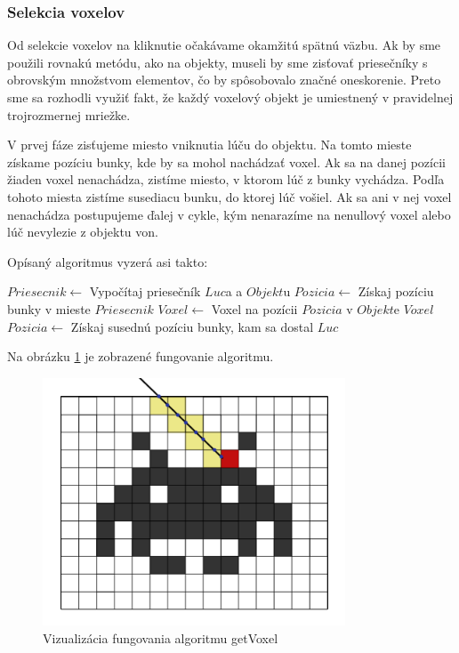 \subsubsection{Selekcia voxelov}
Od selekcie voxelov na kliknutie očakávame okamžitú spätnú väzbu. Ak by sme použili rovnakú metódu, ako na objekty, museli by sme zisťovať priesečníky s obrovským množstvom elementov, čo by spôsobovalo značné oneskorenie. Preto sme sa rozhodli využiť fakt, že každý voxelový objekt je umiestnený v pravidelnej trojrozmernej mriežke.

V prvej fáze zisťujeme miesto vniknutia lúču do objektu.
Na tomto mieste získame pozíciu bunky, kde by sa mohol nachádzať voxel.
Ak sa na danej pozícii žiaden voxel nenachádza, zistíme miesto, v ktorom lúč z bunky vychádza.
Podľa tohoto miesta zistíme susediacu bunku, do ktorej lúč vošiel.
Ak sa ani v nej voxel nenachádza postupujeme ďalej v cykle, kým nenarazíme na nenullový voxel alebo lúč nevylezie z objektu von. \\

\begin{minipage}{0.9\textwidth}
Opísaný algoritmus vyzerá asi takto:

\begin{algorithmic}
		\State $Priesecnik \gets $ Vypočítaj priesečník $Luc$a a $Objekt$u
		\State $Pozicia \gets $ Získaj pozíciu bunky v mieste $Priesecnik$
			\State $Voxel \gets $ Voxel na pozícii $Pozicia$ v $Objekt$e 
				\State \Return $Voxel$
			\EndIf 
			\State $Pozicia \gets$ Získaj susednú pozíciu bunky, kam sa dostal $Luc$ 
		\EndWhile
	\EndFunction \\
\end{algorithmic} 
\end{minipage}
\eject

Na obrázku \ref{invader} je zobrazené fungovanie algoritmu. 

\begin{figure}[!h]
	\centering
	\includegraphics[width=90mm]{getVoxel.png}
	\caption{Vizualizácia fungovania algoritmu getVoxel}
	\label{invader}
\end{figure} 



